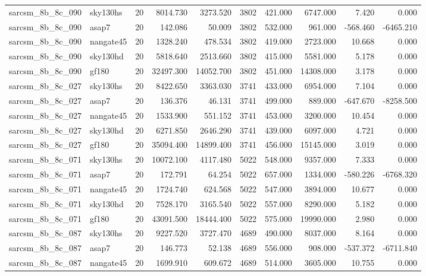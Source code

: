 \documentclass{article}
\begin{document}
\begin{longtable}{llrrrrrrrr}
sarcsm\_8b\_8c\_090 & sky130hs & 20 & 8014.730 & 3273.520 & 3802 & 421.000 & 6747.000 & 7.420 & 0.000 \\
sarcsm\_8b\_8c\_090 & asap7 & 20 & 142.086 & 50.009 & 3802 & 532.000 & 961.000 & -568.460 & -6465.210 \\
sarcsm\_8b\_8c\_090 & nangate45 & 20 & 1328.240 & 478.534 & 3802 & 419.000 & 2723.000 & 10.668 & 0.000 \\
sarcsm\_8b\_8c\_090 & sky130hd & 20 & 5818.640 & 2513.660 & 3802 & 415.000 & 5581.000 & 5.178 & 0.000 \\
sarcsm\_8b\_8c\_090 & gf180 & 20 & 32497.300 & 14052.700 & 3802 & 451.000 & 14308.000 & 3.178 & 0.000 \\
sarcsm\_8b\_8c\_027 & sky130hs & 20 & 8422.650 & 3363.030 & 3741 & 433.000 & 6954.000 & 7.104 & 0.000 \\
sarcsm\_8b\_8c\_027 & asap7 & 20 & 136.376 & 46.131 & 3741 & 499.000 & 889.000 & -647.670 & -8258.500 \\
sarcsm\_8b\_8c\_027 & nangate45 & 20 & 1533.900 & 551.152 & 3741 & 453.000 & 3200.000 & 10.454 & 0.000 \\
sarcsm\_8b\_8c\_027 & sky130hd & 20 & 6271.850 & 2646.290 & 3741 & 439.000 & 6097.000 & 4.721 & 0.000 \\
sarcsm\_8b\_8c\_027 & gf180 & 20 & 35094.400 & 14899.400 & 3741 & 456.000 & 15145.000 & 3.019 & 0.000 \\
sarcsm\_8b\_8c\_071 & sky130hs & 20 & 10072.100 & 4117.480 & 5022 & 548.000 & 9357.000 & 7.333 & 0.000 \\
sarcsm\_8b\_8c\_071 & asap7 & 20 & 172.791 & 64.254 & 5022 & 657.000 & 1334.000 & -580.226 & -6768.320 \\
sarcsm\_8b\_8c\_071 & nangate45 & 20 & 1724.740 & 624.568 & 5022 & 547.000 & 3894.000 & 10.677 & 0.000 \\
sarcsm\_8b\_8c\_071 & sky130hd & 20 & 7528.170 & 3165.540 & 5022 & 557.000 & 8290.000 & 5.182 & 0.000 \\
sarcsm\_8b\_8c\_071 & gf180 & 20 & 43091.500 & 18444.400 & 5022 & 575.000 & 19990.000 & 2.980 & 0.000 \\
sarcsm\_8b\_8c\_087 & sky130hs & 20 & 9227.520 & 3727.470 & 4689 & 490.000 & 8037.000 & 8.164 & 0.000 \\
sarcsm\_8b\_8c\_087 & asap7 & 20 & 146.773 & 52.138 & 4689 & 556.000 & 908.000 & -537.372 & -6711.840 \\
sarcsm\_8b\_8c\_087 & nangate45 & 20 & 1699.910 & 609.672 & 4689 & 514.000 & 3605.000 & 10.755 & 0.000 \\

\end{longtable}
\end{document}
